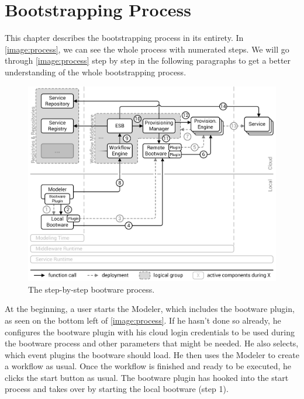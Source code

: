 \chapter{Bootstrapping Process}
\label{process}

This chapter describes the bootstrapping process in its entirety.
In \autoref{image:process}, we can see the whole process with numerated steps.
We will go through \autoref{image:process} step by step in the following paragraphs to get a better understanding of the whole bootstrapping process.

\begin{figure}[!htbp]
	\centering
	\includegraphics[resolution=600]{process/assets/process}
	\caption{The step-by-step bootware process.}
	\label{image:process}
\end{figure}

At the beginning, a user starts the Modeler, which includes the bootware plugin, as seen on the bottom left of \autoref{image:process}.
If he hasn't done so already, he configures the bootware plugin with his cloud login credentials to be used during the bootware process and other parameters that might be needed. He also selects, which event plugins the bootware should load.
He then uses the Modeler to create a workflow as usual.
Once the workflow is finished and ready to be executed, he clicks the start button as usual.
The bootware plugin has hooked into the start process and takes over by starting the local bootware (step 1).

